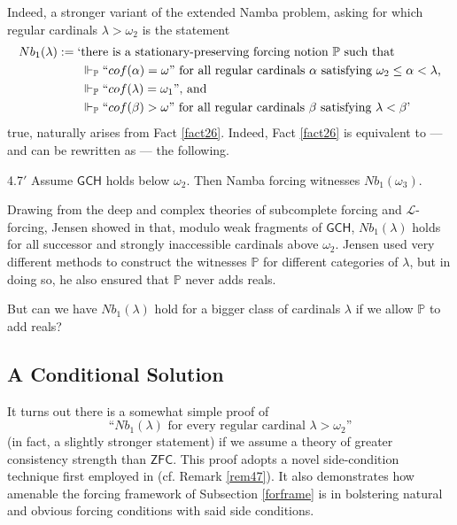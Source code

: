 \documentclass[12pt]{article}
\numberwithin{equation}{section}
\begin{document}
Indeed, a stronger variant of the extended Namba problem, asking for which regular cardinals $\lambda > \omega_2$ is the statement
\begin{align*}
    Nb_1(\lambda) := \text{`} & \text{there is a stationary-preserving forcing notion } \mathbb{P} \text{ such that} \\ 
    & \Vdash_{\mathbb{P}} ``cof(\alpha) = \omega" \text{ for all regular cardinals } \alpha \text{ satisfying } \omega_2 \leq \alpha < \lambda \text{,} \\
    & \Vdash_{\mathbb{P}} ``cof(\lambda) = \omega_1" \text{, and} \\
    & \Vdash_{\mathbb{P}} ``cof(\beta) > \omega" \text{ for all regular cardinals } \beta \text{ satisfying } \lambda < \beta \text{'}
\end{align*}
true, naturally arises from Fact \ref{fact26}. Indeed, Fact \ref{fact26} is equivalent to --- and can be rewritten as --- the following.

\begin{customfact}{4.7$'$}\label{f46p}
Assume $\mathsf{GCH}$ holds below $\omega_2$. Then Namba forcing witnesses $Nb_1(\omega_3)$.
\end{customfact}

Drawing from the deep and complex theories of subcomplete forcing and $\mathcal{L}$-forcing, Jensen showed in \cite{lforcing} that, modulo weak fragments of $\mathsf{GCH}$, $Nb_1(\lambda)$ holds for all successor and strongly inaccessible cardinals above $\omega_2$. Jensen used very different methods to construct the witnesses $\mathbb{P}$ for different categories of $\lambda$, but in doing so, he also ensured that $\mathbb{P}$ never adds reals. 

But can we have $Nb_1(\lambda)$ hold for a bigger class of cardinals $\lambda$ if we allow $\mathbb{P}$ to add reals?

\subsection{A Conditional Solution}

It turns out there is a somewhat simple proof of $$\text{``} Nb_1(\lambda) \text{ for every regular cardinal } \lambda > \omega_2 \text{''}$$ (in fact, a slightly stronger statement) if we assume a theory of greater consistency strength than $\mathsf{ZFC}$. This proof adopts a novel side-condition technique first employed in \cite{schindler} (cf. Remark \ref{rem47}). It also demonstrates how amenable the forcing framework of Subsection \ref{forframe} is in bolstering natural and obvious forcing conditions with said side conditions. 
\end{document}
